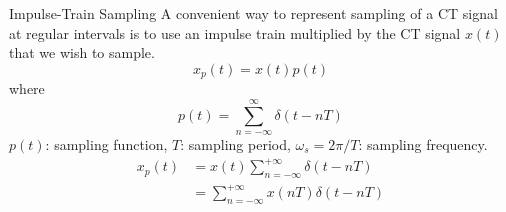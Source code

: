 





\begin{frame}{Impulse-Train Sampling}
    A convenient way to represent sampling of a CT signal at regular intervals is to use an impulse train multiplied by the CT signal $x(t)$ that we wish to sample.
    \begin{equation*}
        x_p(t) = x(t)p(t)
    \end{equation*}
    where
    \begin{equation*}
        p(t) = \sum_{n=-\infty}^{\infty}\delta(t-nT)
    \end{equation*}
    $p(t)$: sampling function, $T$: sampling period, $\omega_s = 2\pi/T$: sampling frequency.
    \begin{align*}
        x_p(t) &= x(t)\sum_{n=-\infty}^{+\infty} \delta(t - nT)\\
        &= \sum_{n=-\infty}^{+\infty} x(nT)\delta(t - nT)
    \end{align*}
\end{frame}


